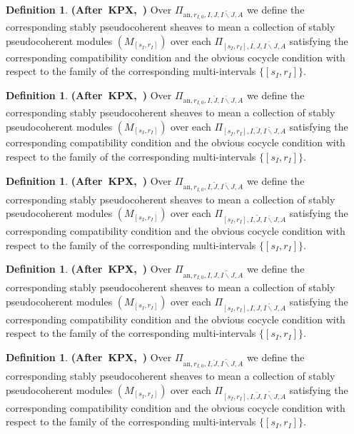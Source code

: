 \documentclass[12pt]{amsart}
\theoremstyle{definition}
\newtheorem{definition}[theorem]{Definition}
\numberwithin{equation}{section}
\begin{document}
\begin{definition} \mbox{\bf{(After KPX, \cite[Definition 2.1.3]{KPX})}}
Over $\Pi_{\mathrm{an},r_{I,0},I,{J},\breve{I\backslash J},A}$ we define the corresponding stably pseudocoherent sheaves to mean a collection of stably pseudocoherent modules $(M_{[s_I,r_I]})$	over each $\Pi_{[s_I,r_I],I,{J},\breve{I\backslash J},A}$ satisfying the corresponding compatibility condition and the obvious cocycle condition with respect to the family of the corresponding multi-intervals $\{[s_I,r_I]\}$.
\end{definition}


\begin{definition} \mbox{\bf{(After KPX, \cite[Definition 2.1.3]{KPX})}}
Over $\Pi_{\mathrm{an},r_{I,0},I,\breve{J},\breve{I\backslash J},A}$ we define the corresponding stably pseudocoherent sheaves to mean a collection of stably pseudocoherent modules $(M_{[s_I,r_I]})$	over each $\Pi_{[s_I,r_I],I,\breve{J},\breve{I\backslash J},A}$ satisfying the corresponding compatibility condition and the obvious cocycle condition with respect to the family of the corresponding multi-intervals $\{[s_I,r_I]\}$.
\end{definition}


\begin{definition} \mbox{\bf{(After KPX, \cite[Definition 2.1.3]{KPX})}}
Over $\Pi_{\mathrm{an},r_{I,0},I,\widetilde{J},\breve{I\backslash J},A}$ we define the corresponding stably pseudocoherent sheaves to mean a collection of stably pseudocoherent modules $(M_{[s_I,r_I]})$ over each $\Pi_{[s_I,r_I],I,\widetilde{J},\breve{I\backslash J},A}$ satisfying the corresponding compatibility condition and the obvious cocycle condition with respect to the family of the corresponding multi-intervals $\{[s_I,r_I]\}$.
\end{definition}


\begin{definition} \mbox{\bf{(After KPX, \cite[Definition 2.1.3]{KPX})}}
Over $\Pi_{\mathrm{an},r_{I,0},I,{J},\widetilde{I\backslash J},A}$ we define the corresponding stably pseudocoherent sheaves to mean a collection of stably pseudocoherent modules $(M_{[s_I,r_I]})$	over each $\Pi_{[s_I,r_I],I,{J},\widetilde{I\backslash J},A}$ satisfying the corresponding compatibility condition and the obvious cocycle condition with respect to the family of the corresponding multi-intervals $\{[s_I,r_I]\}$.
\end{definition}


\begin{definition} \mbox{\bf{(After KPX, \cite[Definition 2.1.3]{KPX})}}
Over $\Pi_{\mathrm{an},r_{I,0},I,\breve{J},\widetilde{I\backslash J},A}$ we define the corresponding stably pseudocoherent sheaves to mean a collection of stably pseudocoherent modules $(M_{[s_I,r_I]})$ over each $\Pi_{[s_I,r_I],I,\breve{J},\widetilde{I\backslash J},A}$ satisfying the corresponding compatibility condition and the obvious cocycle condition with respect to the family of the corresponding multi-intervals $\{[s_I,r_I]\}$.
\end{definition}
\end{document}

